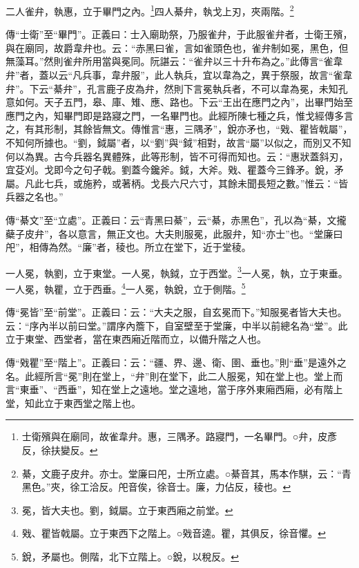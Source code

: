 二人雀弁，執惠，立于畢門之內。\footnote{士衛殯與在廟同，故雀韋弁。惠，三隅矛。路寢門，一名畢門。○弁，皮彥反，徐扶變反。}四人綦弁，執戈上刃，夾兩階。\footnote{綦，文鹿子皮弁。亦士。堂廉曰戺，士所立處。○綦音其，馬本作騏，云：“青黑色。”夾，徐工洽反。戺音俟，徐音士。廉，力佔反，稜也。}


{\noindent\zhuan{}\fzbyks 傳“士衛”至“畢門”。正義曰：士入廟助祭，乃服雀弁，于此服雀弁者，士衛王殯，與在廟同，故爵韋弁也。云：“赤黑曰雀，言如雀頭色也，雀弁制如冕，黑色，但無藻耳。”然則雀弁所用當與冕同。阮諶云：“雀弁以三十升布為之。”此傳言“雀韋弁”者，蓋以云“凡兵事，韋弁服”，此人執兵，宜以韋為之，異于祭服，故言“雀韋弁”。下云“綦弁”，孔言鹿子皮為弁，然則下言冕執兵者，不可以韋為冕，未知孔意如何。天子五門，皋、庫、雉、應、路也。下云“王出在應門之內”，出畢門始至應門之內，知畢門即是路寢之門，一名畢門也。此經所陳七種之兵，惟戈經傳多言之，有其形制，其餘皆無文。傳惟言“惠，三隅矛”，銳亦矛也，“戣、瞿皆戟屬”，不知何所據也。“劉，鉞屬”者，以“劉”與“鉞”相對，故言“屬”以似之，而別又不知何以為異。古今兵器名異體殊，此等形制，皆不可得而知也。云：“惠狀蓋斜刃，宜芟刈。戈即今之句孑戟。劉蓋今鑱斧。鉞，大斧。戣、瞿蓋今三鋒矛。銳，矛屬。凡此七兵，或施矜，或著柄。戈長六尺六寸，其餘未聞長短之數。”惟云：“皆兵器之名也。” \par}

{\noindent\zhuan{}\fzbyks 傳“綦文”至“立處”。正義曰：云“青黑曰綦”，云“綦，赤黑色”，孔以為“綦，文攏蘗子皮弁”，各以意言，無正文也。大夫則服冕，此服弁，知“亦士”也。“堂廉曰戺”，相傳為然。“廉”者，稜也。所立在堂下，近于堂稜。 \par}

一人冕，執劉，立于東堂。一人冕，執鉞，立于西堂。\footnote{冕，皆大夫也。劉，鉞屬。立于東西廂之前堂。}一人冕，執，立于東垂。一人冕，執瞿，立于西垂。\footnote{戣、瞿皆戟屬。立于東西下之階上。○戣音逵。瞿，其俱反，徐音懼。}一人冕，執銳，立于側階。\footnote{銳，矛屬也。側階，北下立階上。○銳，以稅反。}

{\noindent\zhuan{}\fzbyks 傳“冕皆”至“前堂”。正義曰：云：“大夫之服，自玄冕而下。”知服冕者皆大夫也。云：“序內半以前曰堂。”謂序內簷下，自室壁至于堂廉，中半以前總名為“堂”。此立于東堂、西堂者，當在東西廂近階而立，以備升階之人也。 \par}

{\noindent\zhuan{}\fzbyks 傳“戣瞿”至“階上”。正義曰：云：“疆、界、邊、衛、圉、垂也。”則“垂”是遠外之名。此經所言“冕”則在堂上，“弁”則在堂下，此二人服冕，知在堂上也。堂上而言“東垂”、“西垂”，知在堂上之遠地。堂之遠地，當于序外東廂西廂，必有階上堂，知此立于東西堂之階上也。 \par}

